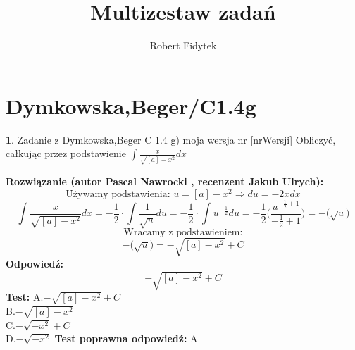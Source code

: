 \documentclass[12pt, a4paper]{article}
\title{Multizestaw zadań}
\author{Robert Fidytek}
\date{}
\theoremstyle{definition} %
\newtheorem{zad}{}
\newcommand{\kategoria}[1]{\section{#1}} %
\newcommand{\zadStart}[1]{\begin{zad}#1\newline} %
\newcommand{\zadStop}{\end{zad}}   %
\newcommand{\rozwStart}[2]{\noindent \textbf{Rozwiązanie (autor #1 , recenzent #2): }\newline} %
\newcommand{\odpStart}{\noindent \textbf{Odpowiedź:}\newline}    %
\newcommand{\odpStop}{\newline}                                             %
\newcommand{\testStart}{\noindent \textbf{Test:}\newline} %
\newcommand{\testStop}{\newline} %
\newcommand{\kluczStart}{\noindent \textbf{Test poprawna odpowiedź:}\newline} %
\newcommand{\kluczStop}{\newline} %
\begin{document}
\maketitle



\kategoria{Dymkowska,Beger/C1.4g}
\zadStart{Zadanie z Dymkowska,Beger C 1.4 g) moja wersja nr [nrWersji]}
Obliczyć, całkując przez podstawienie $\displaystyle \int \frac{x}{\sqrt{[a]-x^2}}dx$
\zadStop
\rozwStart{Pascal Nawrocki}{Jakub Ulrych}
$$\text{Używamy podstawienia: }u=[a]-x^2\Rightarrow du=-2xdx$$
$$\displaystyle \int \frac{x}{\sqrt{[a]-x^2}}dx=-\frac{1}{2}\cdot\displaystyle \int \frac{1}{\sqrt{u}}du=-\frac{1}{2}\cdot\displaystyle \int u^{-\frac{1}{2}}du=-\frac{1}{2}\bigg(\frac{u^{-\frac{1}{2}+1}}{-\frac{1}{2}+1}\bigg)=-\big(\sqrt{u}\big)$$
$$\text{Wracamy z podstawieniem:}$$
$$-\big(\sqrt{u}\big)=-\sqrt{[a]-x^2}+C$$
\odpStart
$$-\sqrt{[a]-x^2}+C$$
\odpStop
\testStart
A.$ -\sqrt{[a]-x^2}+C$
\\
B.$-\sqrt{[a]-x^2}$
\\
C.$-\sqrt{-x^2}+C$
\\
D.$-\sqrt{-x^2}$
\testStop
\kluczStart
A
\kluczStop
\end{document}
